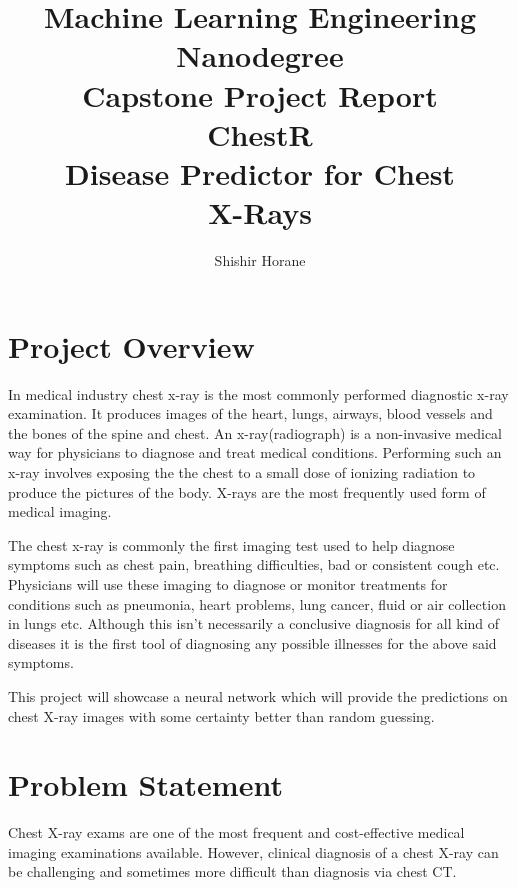 \documentclass{article}
\begin{document}
    \title{\vspace{-3em}
        Machine Learning Engineering Nanodegree \\
        \large Capstone Project Report \\
        \huge ChestR \\
        \large Disease Predictor for Chest \\
        X-Rays} 
    \author{Shishir Horane}
 
    \maketitle 

    \section{Project Overview}

    In medical industry chest x-ray is the most commonly performed diagnostic x-ray examination. It produces images of the heart, lungs, airways, blood vessels and the bones of the spine and chest. An x-ray(radiograph) is a non-invasive medical way for physicians to diagnose and treat medical conditions. Performing such an x-ray involves exposing the the chest to a small dose of ionizing radiation to produce the pictures of the body. X-rays are the most frequently used form of medical imaging. 
    
    The chest x-ray is commonly the first imaging test used to help diagnose symptoms such as chest pain, breathing difficulties, bad or consistent cough etc. Physicians will use these imaging to diagnose or monitor treatments for conditions such as pneumonia, heart problems, lung cancer, fluid or air collection in lungs etc. Although this isn't necessarily a conclusive diagnosis for all kind of diseases it is the first tool of diagnosing any possible illnesses for the above said symptoms.\cite{xray-details} 

    This project will showcase a neural network which will provide the predictions on chest X-ray images with some certainty better than random guessing. 

    \section{Problem Statement}
    Chest X-ray exams are one of the most frequent and cost-effective medical imaging examinations available. However, clinical diagnosis of a chest X-ray can be challenging and sometimes more difficult than diagnosis via chest CT.\cite{nih-kaggle}
    
\end{document}

